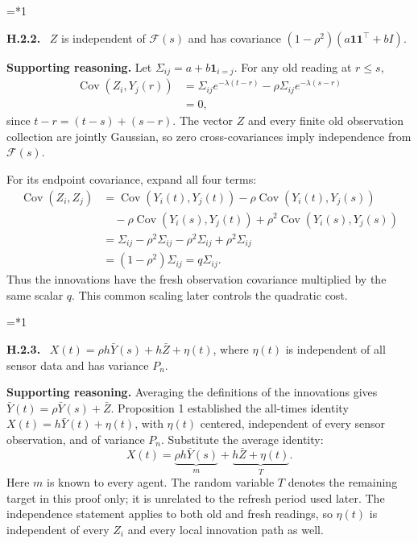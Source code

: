 \documentclass[12pt,letterpaper]{article}
\newcommand{\Cov}{\operatorname{Cov}}
\newcommand{\F}{\mathcal F}
\newenvironment{proofstep}[2]{%
  \begin{list}{}{\leftmargin=\dimexpr 0.17in*#2\relax%
  \setlength{\rightmargin}{0pt}\setlength{\topsep}{5pt}\setlength{\parsep}{2pt}}%
  \item[]\textbf{\textcolor{ink}{#1.}}\ }{\end{list}}
\begin{document}
\begin{proofstep}{H.2.2}{1}
\label{step:H.2.2}
$Z$ is independent of $\mathcal F(s)$ and has covariance $(1-\rho^2)(a\mathbf1\mathbf1^\top+bI)$.

\textbf{Supporting reasoning.}
Let $\Sigma_{ij}=a+b\mathbf1_{i=j}$. For any old reading at $r\le s$,
\begin{align*}
\Cov(Z_i,Y_j(r))
&=\Sigma_{ij}e^{-\lambda(t-r)}-\rho\Sigma_{ij}e^{-\lambda(s-r)}\\
&=0,
\end{align*}
since $t-r=(t-s)+(s-r)$. The vector $Z$ and every finite old observation collection are jointly Gaussian, so zero cross-covariances imply independence from $\F(s)$.

For its endpoint covariance, expand all four terms:
\begin{align*}
\Cov(Z_i,Z_j)
&=\Cov(Y_i(t),Y_j(t))-\rho\Cov(Y_i(t),Y_j(s))\\
&\quad-\rho\Cov(Y_i(s),Y_j(t))+\rho^2\Cov(Y_i(s),Y_j(s))\\
&=\Sigma_{ij}-\rho^2\Sigma_{ij}-\rho^2\Sigma_{ij}+\rho^2\Sigma_{ij}\\
&=(1-\rho^2)\Sigma_{ij}=q\Sigma_{ij}.
\end{align*}
Thus the innovations have the fresh observation covariance multiplied by the same scalar $q$. This common scaling later controls the quadratic cost.
\par{}
\end{proofstep}

\begin{proofstep}{H.2.3}{1}
\label{step:H.2.3}
$X(t)=\rho h\bar Y(s)+h\bar Z+\eta(t)$, where $\eta(t)$ is independent of all sensor data and has variance $P_n$.

\textbf{Supporting reasoning.}
Averaging the definitions of the innovations gives $\bar Y(t)=\rho\bar Y(s)+\bar Z$. Proposition 1 established the all-times identity $X(t)=h\bar Y(t)+\eta(t)$, with $\eta(t)$ centered, independent of every sensor observation, and of variance $P_n$. Substitute the average identity:
\[
X(t)=\underbrace{\rho h\bar Y(s)}_{m}
+\underbrace{h\bar Z+\eta(t)}_{T}.
\]
Here $m$ is known to every agent. The random variable $T$ denotes the remaining target in this proof only; it is unrelated to the refresh period used later. The independence statement applies to both old and fresh readings, so $\eta(t)$ is independent of every $Z_i$ and every local innovation path as well.
\par{}
\end{proofstep}
\end{document}
